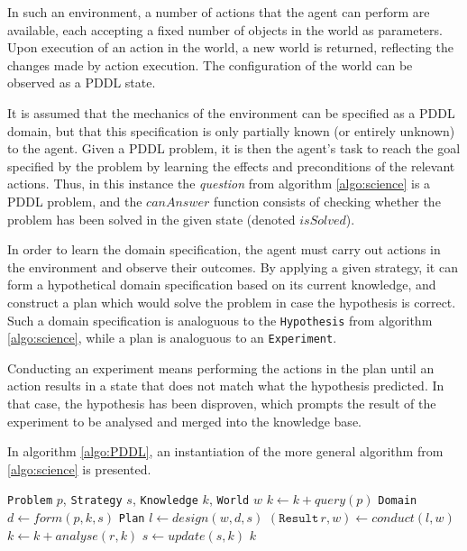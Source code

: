 \documentclass[master.tex]{subfiles}
\begin{document}
In such an environment, a number of actions that the agent can perform are available, each accepting a fixed number of objects in the world as parameters. Upon execution of an action in the world, a new world is returned, reflecting the changes made by action execution. The configuration of the world can be observed as a PDDL state.

It is assumed that the mechanics of the environment can be specified as a PDDL domain, but that this specification is only partially known (or entirely unknown) to the agent. Given a PDDL problem, it is then the agent's task to reach the goal specified by the problem by learning the effects and preconditions of the relevant actions. Thus, in this instance the \textit{question} from algorithm \ref{algo:science} is a PDDL problem, and the $canAnswer$ function consists of checking whether the problem has been solved in the given state (denoted $isSolved$).

In order to learn the domain specification, the agent must carry out actions in the environment and observe their outcomes. By applying a given strategy, it can form a hypothetical domain specification based on its current knowledge, and construct a plan which would solve the problem in case the hypothesis is correct. Such a domain specification is analoguous to the \texttt{Hypothesis} from algorithm \ref{algo:science}, while a plan is analoguous to an \texttt{Experiment}.

Conducting an experiment means performing the actions in the plan until an action results in a state that does not match what the hypothesis predicted. In that case, the hypothesis has been disproven, which prompts the result of the experiment to be analysed and merged into the knowledge base.

In algorithm \ref{algo:PDDL}, an instantiation of the more general algorithm from \ref{algo:science} is presented.

\begin{algorithm}
    \caption{}
    \label{algo:PDDL}

    \begin{algorithmic}
         {\texttt{Problem} $p$, \texttt{Strategy} $s$, \texttt{Knowledge} $k$, \texttt{World} $w$}
                \State $k \gets k + query(p)$
                \State \texttt{Domain} $d \gets form(p, k, s)$
                \State \texttt{Plan} $l \gets design(w, d, s)$
                \State $(\texttt{Result} \, r, w) \gets conduct(l, w)$
                \State $k \gets k + analyse(r, k)$
                \State $s \gets update(s, k)$
            \EndWhile
            \State \Return $k$
        \EndFunction
    \end{algorithmic}
\end{algorithm}


\end{document}
